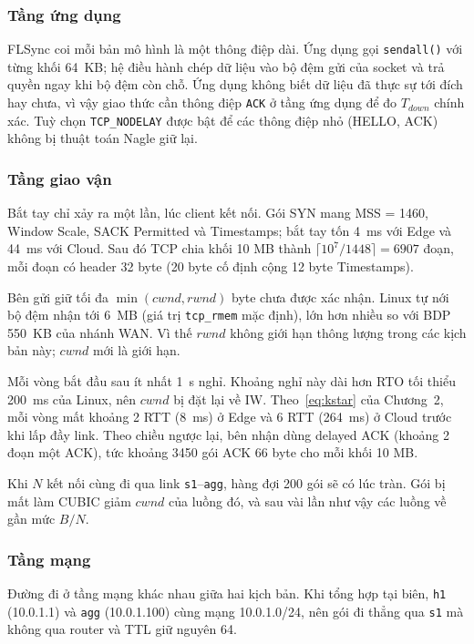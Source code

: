 \subsubsection{Tầng ứng dụng}
FLSync coi mỗi bản mô hình là một thông điệp dài. Ứng dụng gọi \texttt{sendall()} với từng khối 64~KB; hệ điều hành chép dữ liệu vào bộ đệm gửi của socket và trả quyền ngay khi bộ đệm còn chỗ. Ứng dụng không biết dữ liệu đã thực sự tới đích hay chưa, vì vậy giao thức cần thông điệp \texttt{ACK} ở tầng ứng dụng để đo $T_{down}$ chính xác. Tuỳ chọn \texttt{TCP\_NODELAY} được bật để các thông điệp nhỏ (HELLO, ACK) không bị thuật toán Nagle giữ lại.

\subsubsection{Tầng giao vận}
Bắt tay chỉ xảy ra một lần, lúc client kết nối. Gói SYN mang MSS = 1460, Window Scale, SACK Permitted và Timestamps; bắt tay tốn 4~ms với Edge và 44~ms với Cloud. Sau đó TCP chia khối 10 MB thành $\lceil 10^7 / 1448 \rceil = 6907$ đoạn, mỗi đoạn có header 32 byte (20 byte cố định cộng 12 byte Timestamps).

Bên gửi giữ tối đa $\min(cwnd, rwnd)$ byte chưa được xác nhận. Linux tự nới bộ đệm nhận tới 6~MB (giá trị \texttt{tcp\_rmem} mặc định), lớn hơn nhiều so với BDP 550~KB của nhánh WAN. Vì thế $rwnd$ không giới hạn thông lượng trong các kịch bản này; $cwnd$ mới là giới hạn.

Mỗi vòng bắt đầu sau ít nhất 1~s nghỉ. Khoảng nghỉ này dài hơn RTO tối thiểu 200~ms của Linux, nên $cwnd$ bị đặt lại về IW. Theo~\eqref{eq:kstar} của Chương~2, mỗi vòng mất khoảng 2 RTT (8~ms) ở Edge và 6 RTT (264~ms) ở Cloud trước khi lấp đầy link. Theo chiều ngược lại, bên nhận dùng delayed ACK (khoảng 2 đoạn một ACK), tức khoảng 3450 gói ACK 66 byte cho mỗi khối 10 MB.

Khi $N$ kết nối cùng đi qua link \texttt{s1}--\texttt{agg}, hàng đợi 200 gói sẽ có lúc tràn. Gói bị mất làm CUBIC giảm $cwnd$ của luồng đó, và sau vài lần như vậy các luồng về gần mức $B/N$.

\subsubsection{Tầng mạng}
Đường đi ở tầng mạng khác nhau giữa hai kịch bản. Khi tổng hợp tại biên, \texttt{h1} (10.0.1.1) và \texttt{agg} (10.0.1.100) cùng mạng 10.0.1.0/24, nên gói đi thẳng qua \texttt{s1} mà không qua router và TTL giữ nguyên 64.

